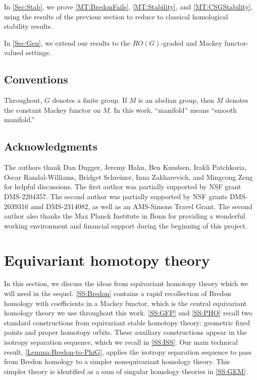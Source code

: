 \documentclass[11pt]{amsart}
\theoremstyle{definition}
\numberwithin{equation}{subsection} %
\def\uM{\underline{M}}
\def\uM{\underline{M}}
\begin{document}
In \cref{Sec:Stab}, we prove \cref{MT:BredonFails},  \cref{MT:Stability}, and \cref{MT:CSGStability}, using the results of the previous section to reduce to classical homological stability results.

In \cref{Sec:Gen}, we extend our results to the $RO(G)$-graded and Mackey functor-valued settings. 

\subsection{Conventions}

Throughout, $G$ denotes a finite group. If $M$ is an abelian group, then $\uM$ denotes the constant Mackey functor on $M$. 
In this work, ``manifold'' means ``smooth manifold.''

\subsection{Acknowledgments}

The authors thank Dan Dugger, Jeremy Hahn, Ben Knudsen, Irakli Patchkoria, Oscar Randal-Williams, Bridget Schreiner, Inna Zakharevich, and Mingcong Zeng for helpful discussions.
The first author was partially supported by NSF grant DMS-2204357.
The second author was partially supported by NSF grants DMS-2039316 amd DMS-2314082, as well as an AMS-Simons Travel Grant. The second author also thanks the Max Planck Institute in Bonn for providing a wonderful working environment and financial support during the beginning of this project.

\section{Equivariant homotopy theory}\label{Sec:Eqvt}

In this section, we discuss the ideas from equivariant homotopy theory which we will need in the sequel. \cref{SS:Bredon} contains a rapid recollection of Bredon homology with coefficients in a Mackey functor, which is the central equivariant homology theory we use throughout this work. \cref{SS:GFP} and \cref{SS:PHO} recall two standard constructions from equivariant stable homotopy theory: geometric fixed points and proper homotopy orbits. These auxiliary constructions appear in the isotropy separation sequence, which we recall in \cref{SS:ISS}. Our main technical result, \cref{Lemma:Bredon-to-PhiG}, applies the isotropy separation sequence to pass from Bredon homology to a simpler nonequivariant homology theory. This simpler theory is identified as a sum of singular homology theories in \cref{SS:GEM}. 
\end{document}
